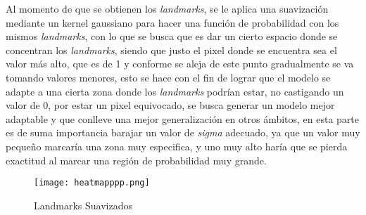 \documentclass[runningheads]{llncs}
\begin{document}
Al momento de que se obtienen los \textit{landmarks}, se le aplica una suavización mediante un kernel gaussiano para hacer una función de probabilidad con los mismos \textit{landmarks}, con lo que se busca que es dar un cierto espacio donde se concentran los \textit{landmarks}, siendo que justo el pixel donde se encuentra sea el valor más alto, que es de 1 y conforme se aleja de este punto gradualmente se va tomando valores menores, esto se hace con el fin de lograr que el modelo se adapte a una cierta zona donde los \textit{landmarks} podrían estar, no castigando un valor de 0, por estar un pixel equivocado, se busca generar un modelo mejor adaptable y que conlleve una mejor generalización  en otros ámbitos, en esta parte es de suma importancia barajar un valor de \textit{sigma} adecuado, ya que un valor muy pequeño marcaría una zona muy especifica, y uno muy alto haría que se pierda exactitud al marcar una región de probabilidad muy grande.

\begin{figure}[H]
    \centering
    \texttt{[image: heatmapppp.png]}
    \caption{Landmarks Suavizados}
    \label{fig:enter-label}
\end{figure}
\end{document}
